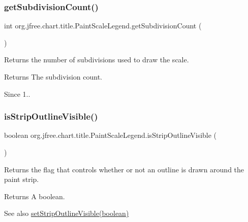 \subsubsection{\texorpdfstring{get\+Subdivision\+Count()}{getSubdivisionCount()}}
{\footnotesize\ttfamily int org.\+jfree.\+chart.\+title.\+Paint\+Scale\+Legend.\+get\+Subdivision\+Count (\begin{DoxyParamCaption}{ }\end{DoxyParamCaption})}

Returns the number of subdivisions used to draw the scale.

\begin{DoxyReturn}{Returns}
The subdivision count.
\end{DoxyReturn}
\begin{DoxySince}{Since}
1.. 
\end{DoxySince}
\mbox{\label{classorg_1_1jfree_1_1chart_1_1title_1_1_paint_scale_legend_a5d129b2bb0ce2b552e36760a01ab1355}} 
\subsubsection{\texorpdfstring{is\+Strip\+Outline\+Visible()}{isStripOutlineVisible()}}
{\footnotesize\ttfamily boolean org.\+jfree.\+chart.\+title.\+Paint\+Scale\+Legend.\+is\+Strip\+Outline\+Visible (\begin{DoxyParamCaption}{ }\end{DoxyParamCaption})}

Returns the flag that controls whether or not an outline is drawn around the paint strip.

\begin{DoxyReturn}{Returns}
A boolean.
\end{DoxyReturn}
\begin{DoxySeeAlso}{See also}
\mbox{\hyperlink{classorg_1_1jfree_1_1chart_1_1title_1_1_paint_scale_legend_a573a98df421a6e4a200e0286a608be8c}{set\+Strip\+Outline\+Visible(boolean)}} 
\end{DoxySeeAlso}
\mbox{\label{classorg_1_1jfree_1_1chart_1_1title_1_1_paint_scale_legend_a45cf98fb34e5987f23c42f5d95a52de7}} 

